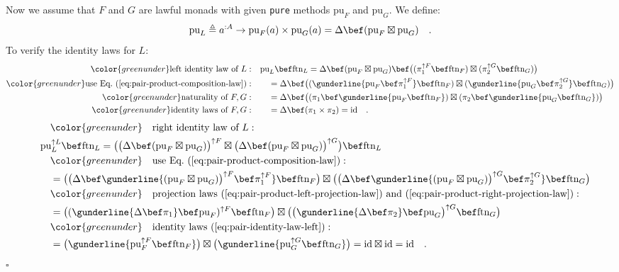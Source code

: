 Now we assume that $F$ and $G$ are lawful monads with given \lstinline!pure!
methods $\text{pu}_{F}$ and $\text{pu}_{G}$. We define:
\[
\text{pu}_{L}\triangleq a^{:A}\rightarrow\text{pu}_{F}(a)\times\text{pu}_{G}(a)=\Delta\bef(\text{pu}_{F}\boxtimes\text{pu}_{G})\quad.
\]
To verify the identity laws for $L$:
\begin{align*}
{\color{greenunder}\text{left identity law of }L:}\quad & \text{pu}_{L}\bef\text{ftn}_{L}=\Delta\bef(\text{pu}_{F}\boxtimes\text{pu}_{G})\bef\big((\pi_{1}^{\uparrow F}\bef\text{ftn}_{F})\boxtimes(\pi_{2}^{\uparrow G}\bef\text{ftn}_{G})\big)\\
{\color{greenunder}\text{use Eq.~(\ref{eq:pair-product-composition-law})}:}\quad & \quad=\Delta\bef\big((\gunderline{\text{pu}_{F}\bef\pi_{1}^{\uparrow F}}\bef\text{ftn}_{F})\boxtimes(\gunderline{\text{pu}_{G}\bef\pi_{2}^{\uparrow G}}\bef\text{ftn}_{G})\big)\\
{\color{greenunder}\text{naturality of }F,G:}\quad & \quad=\Delta\bef\big((\pi_{1}\bef\gunderline{\text{pu}_{F}\bef\text{ftn}_{F}})\boxtimes(\pi_{2}\bef\gunderline{\text{pu}_{G}\bef\text{ftn}_{G}})\big)\\
{\color{greenunder}\text{identity laws of }F,G:}\quad & \quad=\Delta\bef(\pi_{1}\times\pi_{2})=\text{id}\quad.
\end{align*}
\begin{align*}
 & \quad{\color{greenunder}\quad\text{right identity law of }L:}\quad\\
 & \text{pu}_{L}^{\uparrow L}\bef\text{ftn}_{L}=\big(\big(\Delta\bef(\text{pu}_{F}\boxtimes\text{pu}_{G})\big)^{\uparrow F}\boxtimes\big(\Delta\bef(\text{pu}_{F}\boxtimes\text{pu}_{G})\big)^{\uparrow G}\big)\bef\text{ftn}_{L}\\
 & \quad{\color{greenunder}\quad\text{use Eq.~(\ref{eq:pair-product-composition-law})}:}\quad\\
 & \quad=\big(\big(\Delta\bef\gunderline{(\text{pu}_{F}\boxtimes\text{pu}_{G})\big)^{\uparrow F}\bef\pi_{1}^{\uparrow F}}\bef\text{ftn}_{F}\big)\boxtimes\big(\big(\Delta\bef\gunderline{(\text{pu}_{F}\boxtimes\text{pu}_{G})\big)^{\uparrow G}\bef\pi_{2}^{\uparrow G}}\bef\text{ftn}_{G}\big)\\
 & \quad{\color{greenunder}\quad\text{projection laws~(\ref{eq:pair-product-left-projection-law}) and~(\ref{eq:pair-product-right-projection-law})}:}\quad\\
 & \quad=\big((\gunderline{\Delta\bef\pi_{1}}\bef\text{pu}_{F})^{\uparrow F}\bef\text{ftn}_{F}\big)\boxtimes\big(\big(\gunderline{\Delta\bef\pi_{2}}\bef\text{pu}_{G}\big)^{\uparrow G}\bef\text{ftn}_{G}\big)\\
\quad & \quad{\color{greenunder}\quad\text{identity laws~(\ref{eq:pair-identity-law-left})}:}\quad\\
 & \quad=\big(\gunderline{\text{pu}_{F}^{\uparrow F}\bef\text{ftn}_{F}}\big)\boxtimes\big(\gunderline{\text{pu}_{G}^{\uparrow G}\bef\text{ftn}_{G}}\big)=\text{id}\boxtimes\text{id}=\text{id}\quad.
\end{align*}
$\square$

